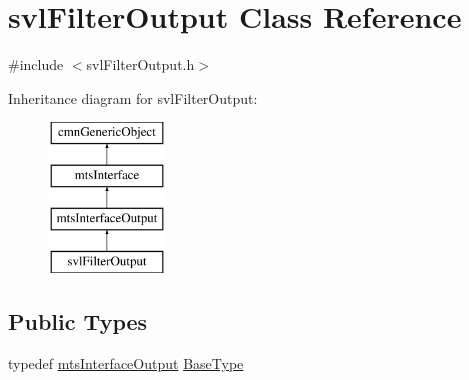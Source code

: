 \hypertarget{classsvl_filter_output}{}\section{svl\+Filter\+Output Class Reference}
\label{classsvl_filter_output}


{\ttfamily \#include $<$svl\+Filter\+Output.\+h$>$}

Inheritance diagram for svl\+Filter\+Output\+:\begin{figure}[H]
\begin{center}
\leavevmode
\includegraphics[height=4.000000cm]{d6/d26/classsvl_filter_output}
\end{center}
\end{figure}
\subsection*{Public Types}
\begin{DoxyCompactItemize}
\item 
typedef \hyperlink{classmts_interface_output}{mts\+Interface\+Output} \hyperlink{classsvl_filter_output_ac8dd607dba96f25d0ae0c249e293d04f}{Base\+Type}
\end{DoxyCompactItemize}
